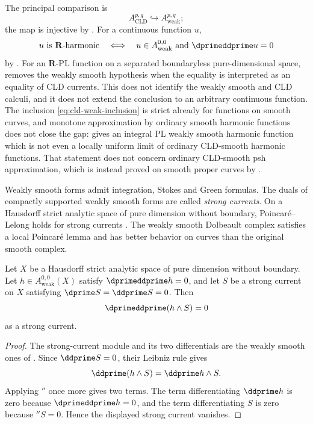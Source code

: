 The principal comparison is
\begin{equation}
              A^{p,q}_{\mathrm{CLD}}\hookrightarrow
              A^{p,q}_{\mathrm{weak}};
\label{eq:cld-weak-inclusion}
\end{equation}
the map is injective by \cite[Proposition~10.14]{GJR26}.  For a continuous
function $u$,
\[
 u\text{ is }\mathbf R\text{-harmonic}
 \quad\Longleftrightarrow\quad
 u\in A^{0,0}_{\mathrm{weak}}\text{ and }\dprimeddprime u=0
\]
by \cite[Proposition~10.17]{GJR26}.
For an $\mathbf R$-PL function on a separated boundaryless pure-dimensional
space,  removes the weakly
smooth hypothesis when the equality is interpreted as an equality of CLD
currents.  This does not identify the weakly smooth and CLD calculi, and it
does not extend the conclusion to an arbitrary continuous function.
The inclusion \eqref{eq:cld-weak-inclusion} is strict already for functions
on smooth curves, and monotone approximation by ordinary smooth harmonic
functions does not close the gap:
 gives an integral PL
weakly smooth harmonic function which is not even a locally uniform limit of
ordinary CLD-smooth harmonic functions.  That statement does not concern
ordinary CLD-smooth psh approximation, which is instead proved on smooth
proper curves by
.

Weakly smooth forms admit integration, Stokes and Green formulas.  The duals
of compactly supported weakly smooth forms are called \emph{strong
currents}.  On a Hausdorff strict analytic space of pure dimension without
boundary, Poincar\'e--Lelong holds for strong currents
\cite[Theorem~12.7]{GJR26}.  The weakly smooth Dolbeault complex satisfies a
local Poincar\'e lemma \cite[Theorem~13.1]{GJR26} and has better behavior on
curves than the original smooth complex.

\begin{proposition}
\label{prop:ch18-strong-harmonic-compatibility}
Let $X$ be a Hausdorff strict analytic space of pure dimension without
boundary.  Let $h\in A^{0,0}_{\mathrm{weak}}(X)$ satisfy
$
  \dprimeddprime h=0
$, and let $S$ be a strong current on $X$ satisfying
$
  \dprime S=\ddprime S=0
$.  Then
\[
                   \dprimeddprime(h\wedge S)=0
\]
as a strong current.
\end{proposition}

\begin{proof}
The strong-current module and its two differentials are the weakly smooth
ones of \cite[\S12.2]{GJR26}.  Since $\ddprime S=0$, their Leibniz rule
gives
\[
                  \ddprime(h\wedge S)=\ddprime h\wedge S.
\]
Applying $\dprime$ once more gives two terms.  The term differentiating
$\ddprime h$ is zero because $\dprimeddprime h=0$, and the term
differentiating $S$ is zero because $\dprime S=0$.  Hence the displayed
strong current vanishes.
\end{proof}

